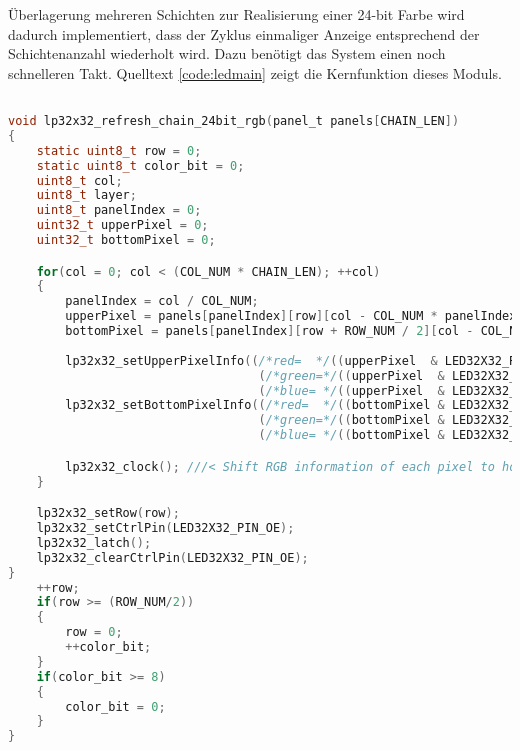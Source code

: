 Überlagerung mehreren Schichten zur Realisierung einer 24-bit Farbe wird dadurch implementiert, dass der Zyklus einmaliger Anzeige entsprechend der Schichtenanzahl wiederholt wird. Dazu benötigt das System einen noch schnelleren Takt. Quelltext \ref{code:ledmain} zeigt die Kernfunktion dieses Moduls.

\begin{lstlisting}[language={c}, caption={Schritte von Panel-Anzeige}, label={code:ledmain}]

void lp32x32_refresh_chain_24bit_rgb(panel_t panels[CHAIN_LEN])
{
    static uint8_t row = 0;
    static uint8_t color_bit = 0;
    uint8_t col;
    uint8_t layer;
    uint8_t panelIndex = 0;
    uint32_t upperPixel = 0;
    uint32_t bottomPixel = 0;

    for(col = 0; col < (COL_NUM * CHAIN_LEN); ++col)
    {
        panelIndex = col / COL_NUM;
        upperPixel = panels[panelIndex][row][col - COL_NUM * panelIndex].particle_count;
        bottomPixel = panels[panelIndex][row + ROW_NUM / 2][col - COL_NUM * panelIndex].particle_count;
        
        lp32x32_setUpperPixelInfo((/*red=  */((upperPixel  & LED32X32_RGB24_R_MASK) >> 16)), 
                                   (/*green=*/((upperPixel  & LED32X32_RGB24_G_MASK) >>  8)),
                                   (/*blue= */((upperPixel  & LED32X32_RGB24_B_MASK)      )));
        lp32x32_setBottomPixelInfo((/*red=  */((bottomPixel & LED32X32_RGB24_R_MASK) >> 16)), 
                                   (/*green=*/((bottomPixel & LED32X32_RGB24_G_MASK) >>  8)),
                                   (/*blue= */((bottomPixel & LED32X32_RGB24_B_MASK)      )));

        lp32x32_clock(); ///< Shift RGB information of each pixel to horizontal direction
    }

    lp32x32_setRow(row);
    lp32x32_setCtrlPin(LED32X32_PIN_OE);
    lp32x32_latch();
    lp32x32_clearCtrlPin(LED32X32_PIN_OE);
}
    ++row;
    if(row >= (ROW_NUM/2))
    {
        row = 0;
        ++color_bit;
    }
    if(color_bit >= 8)
    {
        color_bit = 0;
    }
}
\end{lstlisting}
